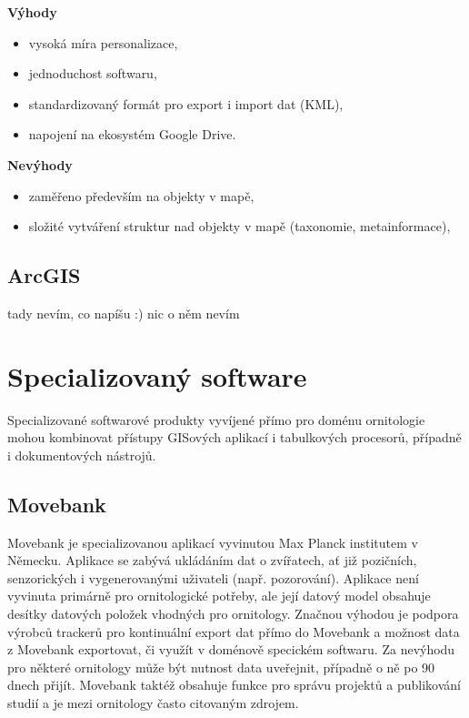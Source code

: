 \textbf{Výhody}

\begin{itemize}
	\item vysoká míra personalizace,
	\item jednoduchost softwaru,
	\item standardizovaný formát pro export i import dat (KML),
	\item napojení na ekosystém Google Drive.
\end{itemize}

\textbf{Nevýhody}

\begin{itemize}
	\item zaměřeno především na objekty v mapě,
	\item složité vytváření struktur nad objekty v mapě (taxonomie, metainformace),
\end{itemize}

\subsection{ArcGIS}

tady nevím, co napíšu :) nic o něm nevím

\section{Specializovaný software}

Specializované softwarové produkty vyvíjené přímo pro doménu ornitologie mohou kombinovat přístupy GISových aplikací i tabulkových procesorů, případně i dokumentových nástrojů. %

\subsection{Movebank}

Movebank je specializovanou aplikací vyvinutou Max Planck institutem v Německu. Aplikace se zabývá ukládáním dat o zvířatech, ať již pozičních, senzorických i vygenerovanými uživateli (např. pozorování). Aplikace není vyvinuta primárně pro ornitologické potřeby, ale její datový model obsahuje desítky datových položek vhodných pro ornitology. Značnou výhodou je podpora výrobců trackerů pro kontinuální export dat přímo do Movebank a možnost data z Movebank exportovat, či využít v doménově specickém softwaru. Za nevýhodu pro některé ornitology může být nutnost data uveřejnit, případně o ně po 90 dnech přijít. Movebank taktéž obsahuje funkce pro správu projektů a publikování studií a je mezi ornitology často citovaným zdrojem.

